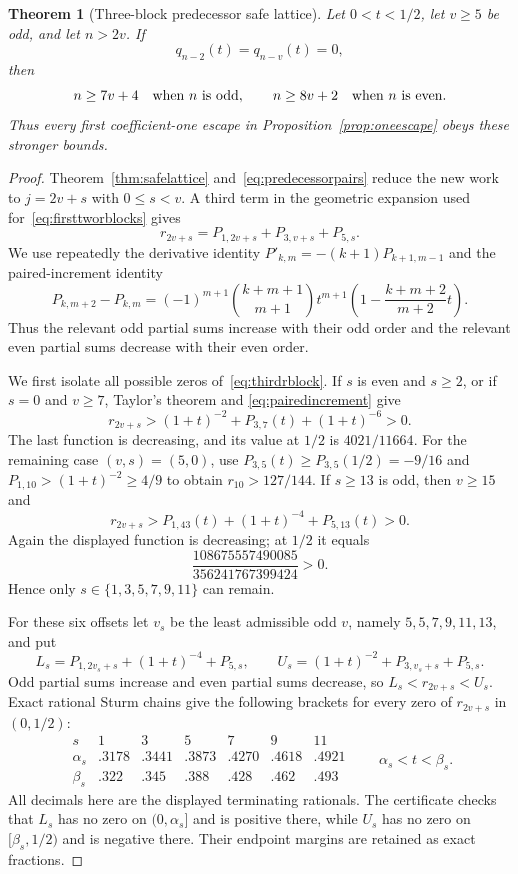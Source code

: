 \documentclass[11pt]{article}
\newtheorem{theorem}{Theorem}[section]
\theoremstyle{remark}
\numberwithin{equation}{section}
\begin{document}
\begin{theorem}[Three-block predecessor safe lattice]
\label{thm:threeblocks}
Let $0<t<1/2$, let $v\ge5$ be odd, and let $n>2v$.  If
\[
 q_{n-2}(t)=q_{n-v}(t)=0,
\]
then
\[
 n\ge7v+4\quad\hbox{when $n$ is odd},\qquad
 n\ge8v+2\quad\hbox{when $n$ is even}.
\]
Thus every first coefficient-one escape in
Proposition~\ref{prop:oneescape} obeys these stronger bounds.
\end{theorem}
\begin{proof}
Theorem~\ref{thm:safelattice} and~\eqref{eq:predecessorpairs} reduce the new
work to $j=2v+s$ with $0\le s<v$.  A third term in the geometric expansion
used for~\eqref{eq:firsttworblocks} gives
\begin{equation}\label{eq:thirdrblock}
 r_{2v+s}=P_{1,2v+s}+P_{3,v+s}+P_{5,s}.
\end{equation}
We use repeatedly the derivative identity
$P'_{k,m}=-(k+1)P_{k+1,m-1}$ and the paired-increment identity
\begin{equation}\label{eq:pairedincrement}
 P_{k,m+2}-P_{k,m}
 =(-1)^{m+1}{k+m+1\choose m+1}t^{m+1}
 \left(1-\frac{k+m+2}{m+2}t\right).
\end{equation}
Thus the relevant odd partial sums increase with their odd order and the
relevant even partial sums decrease with their even order.

We first isolate all possible zeros of~\eqref{eq:thirdrblock}.  If $s$ is even
and $s\ge2$, or if $s=0$ and $v\ge7$, Taylor's theorem and
\eqref{eq:pairedincrement} give
\[
 r_{2v+s}>(1+t)^{-2}+P_{3,7}(t)+(1+t)^{-6}>0.
\]
The last function is decreasing, and its value at $1/2$ is $4021/11664$.
For the remaining case $(v,s)=(5,0)$, use
$P_{3,5}(t)\ge P_{3,5}(1/2)=-9/16$ and
$P_{1,10}>(1+t)^{-2}\ge4/9$ to obtain
$r_{10}>127/144$.  If $s\ge13$ is odd, then $v\ge15$ and
\[
 r_{2v+s}>P_{1,43}(t)+(1+t)^{-4}+P_{5,13}(t)>0.
\]
Again the displayed function is decreasing; at $1/2$ it equals
\[
 \frac{108675557490085}{356241767399424}>0.
\]
Hence only $s\in\{1,3,5,7,9,11\}$ can remain.

For these six offsets let $v_s$ be the least admissible odd $v$, namely
$5,5,7,9,11,13$, and put
\[
 L_s=P_{1,2v_s+s}+(1+t)^{-4}+P_{5,s},\qquad
 U_s=(1+t)^{-2}+P_{3,v_s+s}+P_{5,s}.
\]
Odd partial sums increase and even partial sums decrease, so
$L_s<r_{2v+s}<U_s$.  Exact rational Sturm chains give the following brackets
for every zero of $r_{2v+s}$ in $(0,1/2)$:
\[
\begin{array}{c|cccccc}
s&1&3&5&7&9&11\\ \hline
\alpha_s&.3178&.3441&.3873&.4270&.4618&.4921\\
\beta_s &.322 &.345 &.388 &.428 &.462 &.493
\end{array}
\qquad \alpha_s<t<\beta_s.
\]
All decimals here are the displayed terminating rationals.  The certificate
checks that $L_s$ has no zero on $(0,\alpha_s]$ and is positive there, while
$U_s$ has no zero on $[\beta_s,1/2)$ and is negative there.  Their endpoint
margins are retained as exact fractions.


\end{proof}
\end{document}
